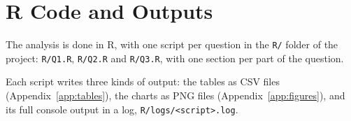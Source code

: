 \clearpage
\section{R Code and Outputs}\label{app:code}

The analysis is done in R, with one script per question in the \texttt{R/} folder of the project: \texttt{R/Q1.R}, \texttt{R/Q2.R} and \texttt{R/Q3.R}, with one section per part of the question.

Each script writes three kinds of output: the tables as CSV files (Appendix~\ref{app:tables}), the charts as PNG files (Appendix~\ref{app:figures}), and its full console output in a log, \texttt{R/logs/<script>.log}.
